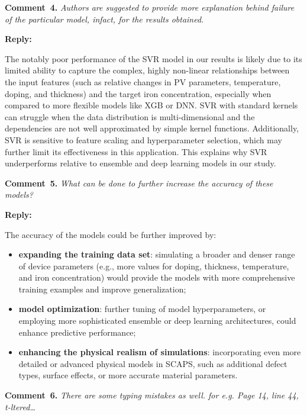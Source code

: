 \documentclass[a4paper,fleqn]{cas-sc}
\begin{document}
\vspace{1cm}
\noindent
\textcolor[rgb]{0.00,0.50,1.00}{\textbf{Comment~4.}}
\emph{Authors are suggested to provide more explanation behind failure of the particular model, infact, for the results obtained.}

\noindent
\textcolor[rgb]{0.51,0.00,0.00}{\textbf{Reply:}}

The notably poor performance of the SVR model in our results is likely due to its limited ability to capture the complex, highly non-linear relationships between the input features (such as relative changes in PV parameters, temperature, doping, and thickness) and the target iron concentration, especially when compared to more flexible models like XGB or DNN. 
SVR with standard kernels can struggle when the data distribution is multi-dimensional and the dependencies are not well approximated by simple kernel functions. 
Additionally, SVR is sensitive to feature scaling and hyperparameter selection, which may further limit its effectiveness in this application. 
This explains why SVR underperforms relative to ensemble and deep learning models in our study.

\vspace{1cm}
\noindent
\textcolor[rgb]{0.00,0.50,1.00}{\textbf{Comment~5.}}
\emph{What can be done to further increase the accuracy of these models?}

\noindent
\textcolor[rgb]{0.51,0.00,0.00}{\textbf{Reply:}}

The accuracy of the models could be further improved by:
\begin{itemize}
    \item \textbf{expanding the training data set}: simulating a broader and denser range of device parameters (e.g., more values for doping, thickness, temperature, and iron concentration) would provide the models with more comprehensive training examples and improve generalization;
    \item \textbf{model optimization}: further tuning of model hyperparameters, or employing more sophisticated ensemble or deep learning architectures, could enhance predictive performance;
    \item \textbf{enhancing the physical realism of simulations}: incorporating even more detailed or advanced physical models in SCAPS, such as additional defect types, surface effects, or more accurate material parameters.
\end{itemize}


\vspace{1cm}
\noindent
\textcolor[rgb]{0.00,0.50,1.00}{\textbf{Comment~6.}}
\emph{There are some typing mistakes as well. for e.g. Page 14, line 44, t-ltered…}
\end{document}
